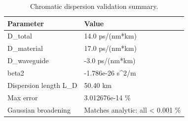 \begin{table}[!ht]
  \caption{Chromatic dispersion validation summary.}
  \label{tab:cd}
  \centering
  \begin{tabular}{l l}
    \toprule
    Parameter & Value \\
    \midrule
    D\_total & 14.0 ps/(nm*km) \\
    D\_material & 17.0 ps/(nm*km) \\
    D\_waveguide & -3.0 ps/(nm*km) \\
    beta2 & -1.786e-26 s\textasciicircum{}2/m \\
    Dispersion length L\_D & 50.40 km \\
    Max error & 3.012676e-14 \% \\
    Gaussian broadening & Matches analytic: all < 0.001 \% \\
    \bottomrule
  \end{tabular}
\end{table}
